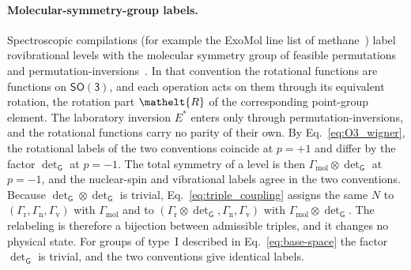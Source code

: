 \documentclass[
  reprint,
  aps,
  prx,
  superscriptaddress,
  amsmath,
  amssymb,
  longbibliography
]{revtex4-2}
\newcommand{\eltfont}[1]{{\let\sigma\eltsigma\mathelt{#1}}}
\newcommand{\grp}[1]{\mathsf{#1}}
\newcommand{\elt}[1]{\eltfont{#1}}
\newcommand{\rotpart}{\elt{R}}         %
\newcommand{\parity}{p}               %
\providecommand{\Gmol}{\Gamma_{\mathrm{mol}}}
\providecommand{\Grot}{\Gamma_{\mathrm{r}}}
\providecommand{\Gvib}{\Gamma_{\mathrm{v}}}
\providecommand{\Gspin}{\Gamma_{\mathrm{n}}}
\providecommand{\SOthree}{\grp{SO(3)}}
\begin{document}
\paragraph{Molecular-symmetry-group labels.}
Spectroscopic compilations (for example the ExoMol line list of methane~\cite{Yurchenko2024}) label rovibrational levels with the molecular symmetry group of feasible permutations and permutation-inversions~\cite{LonguetHiggins1963,BunkerJensen2006}.
In that convention the rotational functions are functions on $\SOthree$, and each operation acts on them through its equivalent rotation, the rotation part $\rotpart$ of the corresponding point-group element.
The laboratory inversion $E^{*}$ enters only through permutation-inversions, and the rotational functions carry no parity of their own.
By Eq.~\eqref{eq:O3_wigner}, the rotational labels of the two conventions coincide at $\parity=+1$ and differ by the factor $\det_{\grp{G}}$ at $\parity=-1$.
The total symmetry of a level is then $\Gmol\otimes\det_{\grp{G}}$ at $\parity=-1$, and the nuclear-spin and vibrational labels agree in the two conventions.
Because $\det_{\grp{G}}\otimes\det_{\grp{G}}$ is trivial, Eq.~\eqref{eq:triple_coupling} assigns the same $N$ to $(\Grot,\Gspin,\Gvib)$ with $\Gmol$ and to $(\Grot\otimes\det_{\grp{G}},\Gspin,\Gvib)$ with $\Gmol\otimes\det_{\grp{G}}$.
The relabeling is therefore a bijection between admissible triples, and it changes no physical state.
For groups of type~I described in Eq.~\eqref{eq:base-space} the factor $\det_{\grp{G}}$ is trivial, and the two conventions give identical labels.
\end{document}
